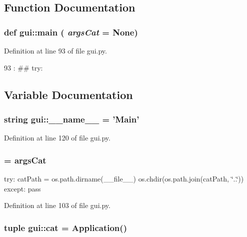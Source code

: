 \subsection{Function Documentation}
\hypertarget{namespacegui_a32d7eb912f06264f7e94b4d26ce2bab3}{
\subsubsection[{main}]{\setlength{\rightskip}{0pt plus 5cm}def gui::main ( {\em argsCat} = {\ttfamily None})}}
\label{namespacegui_a32d7eb912f06264f7e94b4d26ce2bab3}


Definition at line 93 of file gui.py.


\begin{DoxyCode}
93 :
##     try:
\end{DoxyCode}


\subsection{Variable Documentation}
\hypertarget{namespacegui_ae7e8a0ad778b5c4ef10c8270a6e33d2c}{
\subsubsection[{\_\-\_\-name\_\-\_\-}]{\setlength{\rightskip}{0pt plus 5cm}string {\bf gui::\_\-\_\-name\_\-\_\-} = 'Main'}}
\label{namespacegui_ae7e8a0ad778b5c4ef10c8270a6e33d2c}


Definition at line 120 of file gui.py.\hypertarget{namespacegui_a9b8a11cae23a61862fdc77e37a0398df}{
\subsubsection[{args}]{ = argsCat}}
\label{namespacegui_a9b8a11cae23a61862fdc77e37a0398df}


try: catPath = os.path.dirname(\_\-\_\-file\_\-\_\-) os.chdir(os.path.join(catPath, \char`\"{}..\char`\"{})) except: pass 

Definition at line 103 of file gui.py.\hypertarget{namespacegui_a1a4f2e71bc6439236d9608e38b757225}{
\subsubsection[{cat}]{\setlength{\rightskip}{0pt plus 5cm}tuple {\bf gui::cat} = {\bf Application}()}}
\label{namespacegui_a1a4f2e71bc6439236d9608e38b757225}


